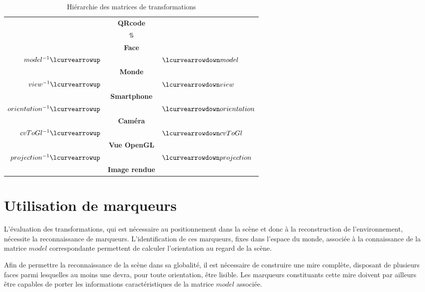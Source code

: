 \documentclass[10pt,a4paper,twoside, twocolumn]{report}
\begin{document}
\begin{table}[!ht]
	\centering
	\begin{tabular}{rcl}
																			& \textbf{QRcode}				&																\\[.2cm]
		$ $																& $\updownharpoons$			& $ $														\\[.2cm]
																			& \textbf{Face}					&																\\[.2cm]
		$model^{-1}				\lcurvearrowup$	&												& $\lcurvearrowdown model$			\\[.2cm]
																			& \textbf{Monde}				&																\\[.2cm]
		$view^{-1}				\lcurvearrowup$	& 											& $\lcurvearrowdown view$				\\[.2cm]
																			& \textbf{Smartphone}		&																\\[.2cm]
		$orientation^{-1}	\lcurvearrowup$	& 											& $\lcurvearrowdown orientation$\\[.2cm]
																			& \textbf{Caméra}				&																\\[.2cm]
		$cvToGl^{-1}			\lcurvearrowup$	& 											& $\lcurvearrowdown cvToGl $		\\[.2cm]
																			& \textbf{Vue OpenGL}		&																\\[.2cm]
		$projection^{-1}	\lcurvearrowup$	&												& $\lcurvearrowdown projection$	\\[.2cm]
																			& \textbf{Image rendue}	&
	\end{tabular}
	\caption{Hiérarchie des matrices de transformations}
	\label{ref:table:hierarchie}
\end{table}



\section{Utilisation de marqueurs}

L'évaluation des transformations, qui est nécessaire au positionnement dans la scène et donc à la reconstruction de l'environnement, nécessite la reconnaissance de marqueurs. L'identification de ces marqueurs, fixes dans l'espace du monde, associée à la connaissance de la matrice $model$ correspondante permettent de calculer l'orientation au regard de la scène.

Afin de permettre la reconnaissance de la scène dans sa globalité, il est nécessaire de construire une mire complète, disposant de plusieurs faces parmi lesquelles au moins une devra, pour toute orientation, être lisible. Les marqueurs constituants cette mire doivent par ailleurs être capables de porter les informations caractéristiques de la matrice $model$ associée.
\end{document}
